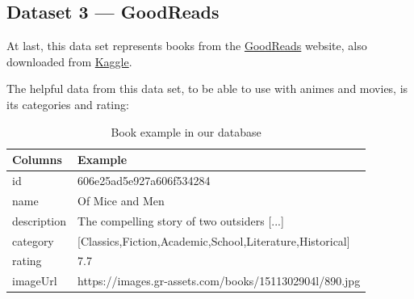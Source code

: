 \documentclass{article}
\newcommand*\fpar{\hspace{1ex}}
\begin{document}
  \subsection{Dataset 3 — GoodReads}
  \label{sec:books}
  \fpar At last, this data set represents books from the \href{https://www.goodreads.com/}{GoodReads} website, also downloaded from \href{https://www.kaggle.com/meetnaren/goodreads-best-books}{Kaggle}.
  \par The helpful data from this data set, to be able to use with animes and movies, is its categories and rating:
  \begin{table}[H]
    \centering
    \begin{tabular}{l|l}
      Columns & Example                       \\ \hline
      id      & 606e25ad5e927a606f534284      \\
      name    & Of Mice and Men               \\
      description & The compelling story of two outsiders [...]           \\
      category& [Classics,Fiction,Academic,School,Literature,Historical]  \\
      rating  & 7.7                           \\
      imageUrl& https://images.gr-assets.com/books/1511302904l/890.jpg
    \end{tabular}
    \caption{Book example in our database}
    \label{table:book}
  \end{table}

\clearpage
\end{document}
